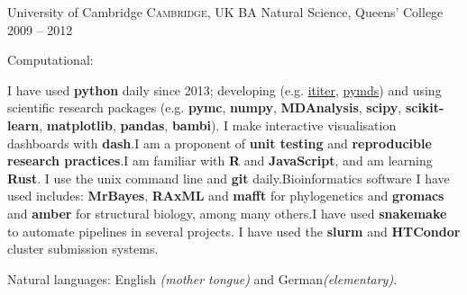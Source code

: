 \documentclass[10pt,a4paper]{article}
\begin{document}
\headedsection
{University of Cambridge}
{\textsc{Cambridge, UK}} {%
  \headedsubsection
  {BA Natural Science, Queens' College}
  {2009 -- 2012}
  {
  }
}

\spacedhrule{0.9em}{-0.4em}


\inlineheadsection  %
{Computational:} {
  
  I have used \textbf{python} daily since 2013; developing (e.g.\@
  \href{https://ititer.readthedocs.io/}{ititer},
  \href{https://pymds.readthedocs.io}{pymds}) and using scientific research packages
  (e.g. \textbf{pymc}, \textbf{numpy}, \textbf{MDAnalysis}, \textbf{scipy},
  \textbf{scikit-learn}, \textbf{matplotlib}, \textbf{pandas}, \textbf{bambi}). I make
  interactive visualisation dashboards with \textbf{dash}.\sbull I am a proponent of
  \textbf{unit testing} and \textbf{reproducible research practices}.\sbull I am familiar
  with \textbf{R} and \textbf{JavaScript}, and am learning \textbf{Rust}. \sbull I use
  the unix command line and \textbf{git} daily.\sbull Bioinformatics software I have used
  includes: \textbf{MrBayes}, \textbf{RAxML} and \textbf{mafft} for phylogenetics and
  \textbf{gromacs} and \textbf{amber} for structural biology, among many others.\sbull I
  have used \textbf{snakemake} to automate pipelines in several projects.\sbull
  I have used the \textbf{slurm} and \textbf{HTCondor} cluster submission systems.}

\vspace{0.5em}
\inlineheadsection
{Natural languages:}
{English \emph{(mother tongue)} and German\emph{(elementary)}.}

\spacedhrule{1.6em}{-0.4em}

\nocite{*}
\printbibliography

\spacedhrule{1.6em}{-0.4em}
\end{document}

